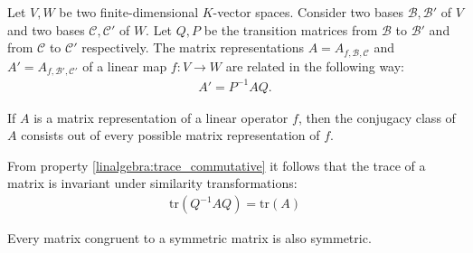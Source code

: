 	\begin{property}\label{linalgebra:theorem:transition_matrix_representation}
        	Let $V,W$ be two finite-dimensional $K$-vector spaces. Consider two bases $\mathcal{B}, \mathcal{B}'$ of $V$ and two bases $\mathcal{C}, \mathcal{C}'$ of $W$. Let $Q, P$ be the transition matrices from $\mathcal{B}$ to $\mathcal{B}'$ and from $\mathcal{C}$ to $\mathcal{C}'$ respectively. The matrix representations $A=A_{f, \mathcal{B}, \mathcal{C}}$ and $A' = A_{f, \mathcal{B}', \mathcal{C}'}$ of a linear map $f:V\rightarrow W$ are related in the following way:
	        \begin{gather}
        	    	A' = P^{-1}AQ.
        	\end{gather}
	\end{property}

        \begin{remark}
        	If $A$ is a matrix representation of a linear operator $f$, then the conjugacy class of $A$ consists out of every possible matrix representation of $f$.
        \end{remark}
        
        \begin{property}[Trace]
        	From property \ref{linalgebra:trace_commutative} it follows that the trace of a matrix is invariant under similarity transformations:
        	\begin{gather}
            		\label{linalgebra:trace_invariance}
            		\text{tr}(Q^{-1}AQ) = \text{tr}(A)
	        \end{gather}
        \end{property}
        
        \begin{property}
        	Every matrix congruent to a symmetric matrix is also symmetric.
        \end{property}
        
